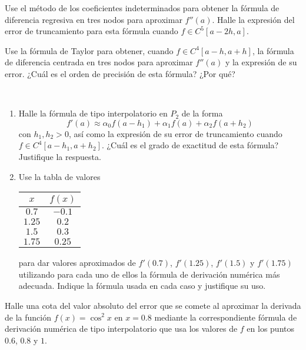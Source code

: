 \begin{ejercicio}\label{ej:2.1.5}
    Use el método de los coeficientes indeterminados para obtener la fórmula de diferencia regresiva en tres nodos para aproximar $f''(a)$. Halle la expresión del error de truncamiento para esta fórmula cuando $f \in C^5[a - 2h, a]$.
\end{ejercicio}

\begin{ejercicio}\label{ej:2.1.6}
    Use la fórmula de Taylor para obtener, cuando $f \in C^4[a - h, a + h]$, la fórmula de diferencia centrada en tres nodos para aproximar $f''(a)$ y la expresión de su error. ¿Cuál es el orden de precisión de esta fórmula? ¿Por qué?
\end{ejercicio}

\begin{ejercicio}\label{ej:2.1.7}~
    \begin{enumerate}
        \item Halle la fórmula de tipo interpolatorio en $P_2$ de la forma
        \[
        f'(a) \approx \alpha_0 f(a - h_1) + \alpha_1 f(a) + \alpha_2 f(a + h_2)
        \]
        con $h_1, h_2 > 0$, así como la expresión de su error de truncamiento cuando $f \in C^4[a - h_1, a + h_2]$. ¿Cuál es el grado de exactitud de esta fórmula? Justifique la respuesta.
        
        \item Use la tabla de valores
        \begin{center}
            \begin{tabular}{c|c}
                $x$ & $f(x)$ \\
                \hline
                $0.7$ & $-0.1$ \\
                $1.25$ & $0.2$ \\
                $1.5$ & $0.3$ \\
                $1.75$ & $0.25$
            \end{tabular}
        \end{center}
        para dar valores aproximados de $f'(0.7)$, $f'(1.25)$, $f'(1.5)$ y $f'(1.75)$ utilizando para cada uno de ellos la fórmula de derivación numérica más adecuada. Indique la fórmula usada en cada caso y justifique su uso.
    \end{enumerate}
\end{ejercicio}

\begin{ejercicio}\label{ej:2.1.8}
    Halle una cota del valor absoluto del error que se comete al aproximar la derivada de la función $f(x) = \cos^2 x$ en $x = 0.8$ mediante la correspondiente fórmula de derivación numérica de tipo interpolatorio que usa los valores de $f$ en los puntos $0.6$, $0.8$ y $1$.
\end{ejercicio}